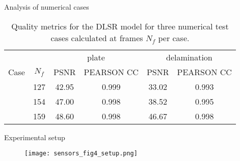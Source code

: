 \documentclass[10pt,aspectratio=169,dvipsnames]{beamer} %
\begin{document}
		\begin{frame}{Analysis of numerical cases}
			\begin{table}[!h]
				\centering \footnotesize
				\caption{Quality metrics for the DLSR model for three numerical test cases calculated at frames $N_f$ per case.}	
				\begin{tabular}{lccccc}
					\toprule
					& & \multicolumn{2}{c}{plate} & \multicolumn{2}{c}{delamination} \\
					\cmidrule(lr){3-4} \cmidrule(lr){5-6}
					Case & $N_f$ & PSNR & PEARSON CC & PSNR & PEARSON CC \\ 
					\midrule
					\multirow{3}{*}{}  & 127  & 42.95 & 0.999 & 33.02 & 0.993 \\					
					\midrule
					\multirow{3}{*}{}  & 154 & 47.00 & 0.998 & 38.52 & 0.995 
					\\
					\midrule					
					\multirow{3}{*}{}  & 159 & 48.60 & 0.998 & 46.67 & 0.998 \\					
					\bottomrule
				\end{tabular}
				\label{tab:num_DLSR_results}
			\end{table}			
		\end{frame}
		\begin{frame}{Experimental setup}
			\begin{figure}
				\centering
				\texttt{[image: sensors\_fig4\_setup.png]}
			\end{figure}
		\end{frame}
		\setcounter{subfigure}{0}
\end{document}
